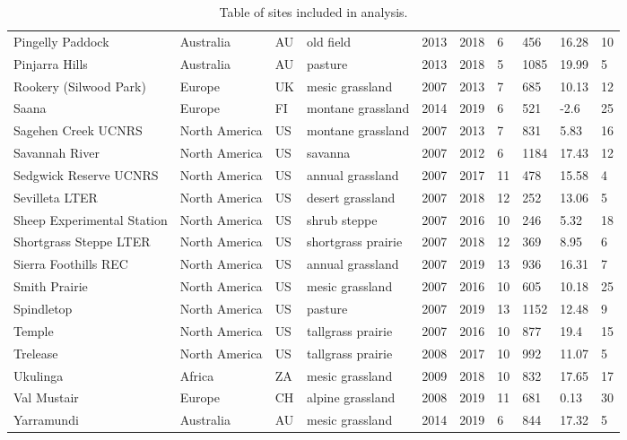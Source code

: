 \documentclass[twoside,12pt,final]{ucthesis-CA2012}
\begin{document}
\begin{ucmainmatter}
\begin{table}[ht]
{\begin{tabular}{llllllllll}
  Pingelly Paddock & Australia & AU & old field & 2013 & 2018 & 6 & 456 & 16.28 & 10 \\ 
  Pinjarra Hills & Australia & AU & pasture & 2013 & 2018 & 5 & 1085 & 19.99 & 5 \\ 
  Rookery (Silwood Park) & Europe & UK & mesic grassland & 2007 & 2013 & 7 & 685 & 10.13 & 12 \\ 
  Saana & Europe & FI & montane grassland & 2014 & 2019 & 6 & 521 & -2.6 & 25 \\ 
  Sagehen Creek UCNRS & North America & US & montane grassland & 2007 & 2013 & 7 & 831 & 5.83 & 16 \\ 
  Savannah River & North America & US & savanna & 2007 & 2012 & 6 & 1184 & 17.43 & 12 \\ 
  Sedgwick Reserve UCNRS & North America & US & annual grassland & 2007 & 2017 & 11 & 478 & 15.58 & 4 \\ 
  Sevilleta LTER & North America & US & desert grassland & 2007 & 2018 & 12 & 252 & 13.06 & 5 \\ 
  Sheep Experimental Station & North America & US & shrub steppe & 2007 & 2016 & 10 & 246 & 5.32 & 18 \\ 
  Shortgrass Steppe LTER & North America & US & shortgrass prairie & 2007 & 2018 & 12 & 369 & 8.95 & 6 \\ 
  Sierra Foothills REC & North America & US & annual grassland & 2007 & 2019 & 13 & 936 & 16.31 & 7 \\ 
  Smith Prairie & North America & US & mesic grassland & 2007 & 2016 & 10 & 605 & 10.18 & 25 \\ 
  Spindletop & North America & US & pasture & 2007 & 2019 & 13 & 1152 & 12.48 & 9 \\ 
  Temple & North America & US & tallgrass prairie & 2007 & 2016 & 10 & 877 & 19.4 & 15 \\ 
  Trelease & North America & US & tallgrass prairie & 2008 & 2017 & 10 & 992 & 11.07 & 5 \\ 
  Ukulinga & Africa & ZA & mesic grassland & 2009 & 2018 & 10 & 832 & 17.65 & 17 \\ 
  Val Mustair & Europe & CH & alpine grassland & 2008 & 2019 & 11 & 681 & 0.13 & 30 \\ 
  Yarramundi & Australia & AU & mesic grassland & 2014 & 2019 & 6 & 844 & 17.32 & 5 \\ 
   \hline
\end{tabular}
}
\caption{Table of sites included in analysis.} 
\end{table}
\begin{table}[ht]

\end{table}
\end{ucmainmatter}
\end{document}
